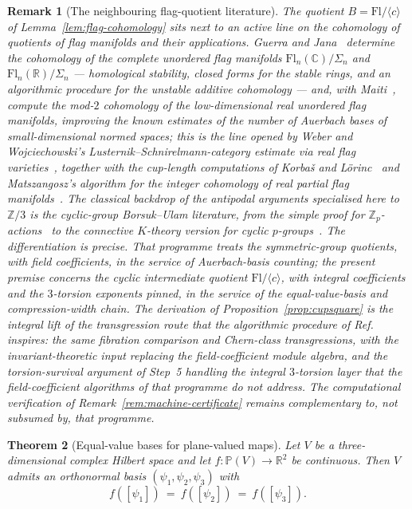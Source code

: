\documentclass[11pt,a4paper]{article}
\newtheorem{theorem}{Theorem}[section]
\newtheorem{remark}[theorem]{Remark}
\begin{document}
\begin{remark}[The neighbouring flag-quotient literature]
\label{rem:flag-literature}
The quotient $B=\mathrm{Fl}/\langle c\rangle$ of Lemma~\ref{lem:flag-cohomology}
sits next to an active line on the cohomology of quotients of flag manifolds
and their applications. Guerra and Jana~\cite{GuerraJana2025} determine the
cohomology of the complete unordered flag manifolds
$\mathrm{Fl}_n(\mathbb C)/\Sigma_n$ and $\mathrm{Fl}_n(\mathbb R)/\Sigma_n$
--- homological stability, closed forms for the stable rings, and an
algorithmic procedure for the unstable additive cohomology --- and, with
Maiti~\cite{GuerraJanaMaiti2025}, compute the mod-$2$ cohomology of the
low-dimensional real unordered flag manifolds, improving the known estimates
of the number of Auerbach bases of small-dimensional normed spaces; this is
the line opened by Weber and Wojciechowski's Lusternik--Schnirelmann-category
estimate via real flag varieties~\cite{WeberWojciechowski2017}, together with
the cup-length computations of Korba{\v s} and L\"orinc~\cite{KorbasLorinc2003}
and Matszangosz's algorithm for the integer cohomology of real partial flag
manifolds~\cite{Matszangosz2021}. The classical backdrop of the antipodal
arguments specialised here to $\mathbb Z/3$ is the cyclic-group
Borsuk--Ulam literature, from the simple proof for
$\mathbb Z_p$-actions~\cite{Singh2010} to the connective $K$-theory version
for cyclic $p$-groups~\cite{Crabb2022}. The differentiation is precise. That
programme treats the \emph{symmetric-group} quotients, with \emph{field}
coefficients, in the service of Auerbach-basis counting; the present premise
concerns the \emph{cyclic} intermediate quotient
$\mathrm{Fl}/\langle c\rangle$, with \emph{integral} coefficients and the
$3$-torsion exponents pinned, in the service of the equal-value-basis and
compression-width chain. The derivation of Proposition~\ref{prop:cupsquare} is the
integral lift of the transgression route that the algorithmic procedure of
Ref.~\cite{GuerraJana2025} inspires: the same fibration comparison and
Chern-class transgressions, with the invariant-theoretic input replacing the
field-coefficient module algebra, and the torsion-survival argument of
Step~5 handling the integral $3$-torsion layer that the field-coefficient
algorithms of that programme do not address. The computational verification of
Remark~\ref{rem:machine-certificate} remains complementary to, not subsumed
by, that programme.
\end{remark}

\begin{theorem}[Equal-value bases for plane-valued maps]
\label{thm:equal-basis-plane}
Let $V$ be a three-dimensional complex Hilbert space and let
$f\colon\mathbb P(V)\to\mathbb R^2$ be continuous. Then $V$ admits an
orthonormal basis $(\psi_1,\psi_2,\psi_3)$ with
\[
f([\psi_1])\ =\ f([\psi_2])\ =\ f([\psi_3]).
\]
\end{theorem}
\end{document}
